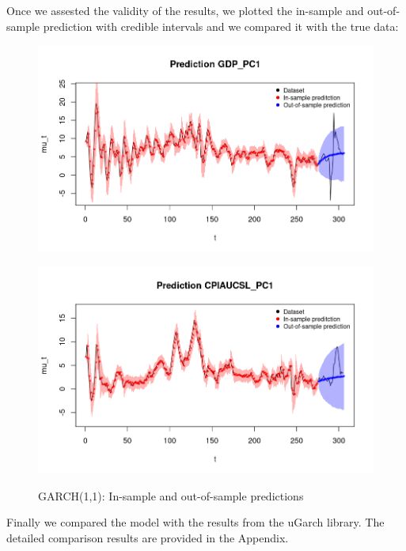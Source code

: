 Once we assested the validity of the results, we plotted the in-sample and out-of-sample prediction with credible intervals and we compared it with the true data:
\begin{figure}[h]
    \centering
    \begin{minipage}[t]{0.7\textwidth}
        \centering
        \includegraphics[width=\textwidth]{../Images/5-GARCH/gdp_prediction.png}
        \label{fig:GARCH_first}
    \end{minipage}
    \begin{minipage}[t]{0.7\textwidth}
        \centering
        \includegraphics[width=\textwidth]{../Images/5-GARCH/infl_prediction.png}
        \label{fig:GARCH_second}
    \end{minipage}
    \caption{GARCH(1,1): In-sample and out-of-sample predictions}
    \label{fig:GARCH_combined}
\end{figure}
Finally we compared the model with the results from the uGarch library. The detailed comparison results are provided in the Appendix. 